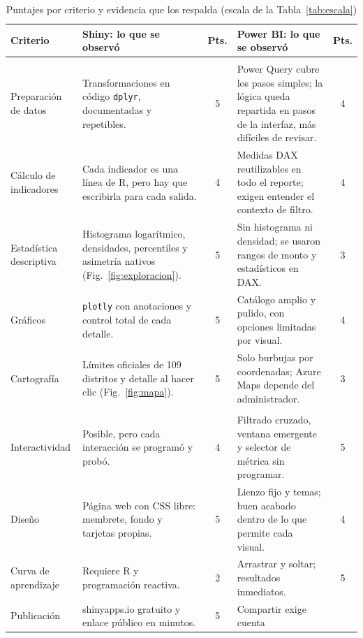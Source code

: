 \documentclass[12pt,a4paper]{article}
\begin{document}
\begin{table}[p]\centering\footnotesize
\setlength{\tabcolsep}{4pt}
\renewcommand{\arraystretch}{1.25}
\caption{Puntajes por criterio y evidencia que los respalda (escala de la Tabla~\ref{tab:escala})}\label{tab:comparacion}
\begin{tabularx}{\textwidth}{>{\raggedright\arraybackslash}p{2.6cm} >{\raggedright\arraybackslash}X c >{\raggedright\arraybackslash}X c}
\toprule
\textbf{Criterio} & \textbf{Shiny: lo que se observó} & \textbf{Pts.} & \textbf{Power BI: lo que se observó} & \textbf{Pts.} \\ \midrule
\multicolumn{5}{l}{\cellcolor{white}\textit{Analítica básica}} \\
Preparación de datos & Transformaciones en código \texttt{dplyr}, documentadas y repetibles. & 5 &
Power Query cubre los pasos simples; la lógica queda repartida en pasos de la interfaz, más difíciles de
revisar. & 4 \\
Cálculo de indicadores & Cada indicador es una línea de R, pero hay que escribirla para cada salida. & 4 &
Medidas DAX reutilizables en todo el reporte; exigen entender el contexto de filtro. & 4 \\
Estadística descriptiva & Histograma logarítmico, densidades, percentiles y asimetría nativos
(Fig.~\ref{fig:exploracion}). & 5 & Sin histograma ni densidad; se usaron rangos de monto y estadísticos
en DAX. & 3 \\
Gráficos & \texttt{plotly} con anotaciones y control total de cada detalle. & 5 & Catálogo amplio y
pulido, con opciones limitadas por visual. & 4 \\
Cartografía & Límites oficiales de 109 distritos y detalle al hacer clic (Fig.~\ref{fig:mapa}). & 5 &
Solo burbujas por coordenadas; Azure Maps depende del administrador. & 3 \\ \midrule
\multicolumn{5}{l}{\cellcolor{white}\textit{Reporting}} \\
Interactividad & Posible, pero cada interacción se programó y probó. & 4 & Filtrado cruzado, ventana
emergente y selector de métrica sin programar. & 5 \\
Diseño & Página web con CSS libre: membrete, fondo y tarjetas propias. & 5 & Lienzo fijo y temas; buen
acabado dentro de lo que permite cada visual. & 4 \\
Curva de aprendizaje & Requiere R y programación reactiva. & 2 & Arrastrar y soltar; resultados
inmediatos. & 5 \\
Publicación & shinyapps.io gratuito y enlace público en minutos. & 5 & Compartir exige cuenta

\end{tabularx}
\end{table}
\end{document}
